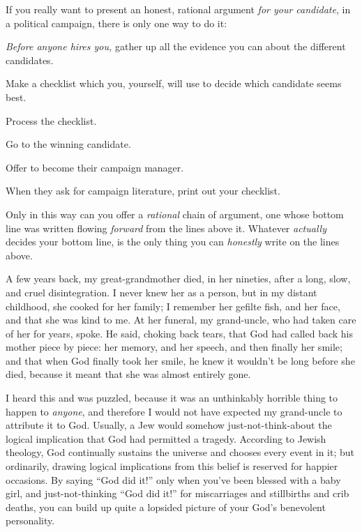 {
 If you really want to present an honest, rational argument
\textit{for your candidate}, in a political campaign, there is only one
way to do it:}

{
 \textit{Before anyone hires you,} gather up all the evidence you
can about the different candidates.}

{
 Make a checklist which you, yourself, will use to decide which
candidate seems best.}

{
 Process the checklist.}

{
 Go to the winning candidate.}

{
 Offer to become their campaign manager.}

{
 When they ask for campaign literature, print out your checklist.}

{
 Only in this way can you offer a \textit{rational} chain of
argument, one whose bottom line was written flowing \textit{forward}
from the lines above it. Whatever \textit{actually} decides your bottom
line, is the only thing you can \textit{honestly} write on the lines
above.}

\myendsectiontext


{
 A few years back, my great-grandmother died, in her nineties,
after a long, slow, and cruel disintegration. I never knew her as a
person, but in my distant childhood, she cooked for her family; I
remember her gefilte fish, and her face, and that she was kind to me.
At her funeral, my grand-uncle, who had taken care of her for years,
spoke. He said, choking back tears, that God had called back his mother
piece by piece: her memory, and her speech, and then finally her smile;
and that when God finally took her smile, he knew it
wouldn't be long before she died, because it meant that
she was almost entirely gone. }

{
 I heard this and was puzzled, because it was an unthinkably
horrible thing to happen to \textit{anyone}, and therefore I would not
have expected my grand-uncle to attribute it to God. Usually, a Jew
would somehow just-not-think-about the logical implication that God had
permitted a tragedy. According to Jewish theology, God continually
sustains the universe and chooses every event in it; but ordinarily,
drawing logical implications from this belief is reserved for happier
occasions. By saying ``God did it!''
only when you've been blessed with a baby girl, and
just-not-thinking ``God did it!''
for miscarriages and stillbirths and crib deaths, you can build up
quite a lopsided picture of your God's benevolent
personality.}

